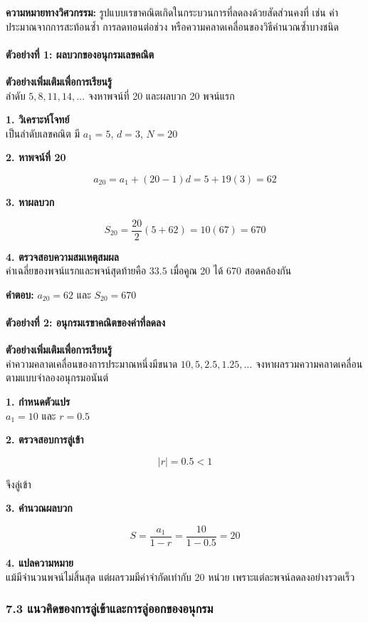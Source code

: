 \textbf{ความหมายทางวิศวกรรม:} รูปแบบเรขาคณิตเกิดในกระบวนการที่ลดลงด้วยสัดส่วนคงที่ เช่น ค่าประมาณจากการสะท้อนซ้ำ การลดทอนต่อช่วง หรือความคลาดเคลื่อนของวิธีคำนวณซ้ำบางชนิด

\paragraph{ตัวอย่างที่ 1: ผลบวกของอนุกรมเลขคณิต}

\textbf{ตัวอย่างเพิ่มเติมเพื่อการเรียนรู้}\\
ลำดับ \(5,8,11,14,\ldots\) จงหาพจน์ที่ 20 และผลบวก 20 พจน์แรก

\textbf{1. วิเคราะห์โจทย์}\\
เป็นลำดับเลขคณิต มี \(a_1=5\), \(d=3\), \(N=20\)

\textbf{2. หาพจน์ที่ 20}

\[
a_{20}=a_1+(20-1)d=5+19(3)=62
\]

\textbf{3. หาผลบวก}

\[
S_{20}=\frac{20}{2}(5+62)=10(67)=670
\]

\textbf{4. ตรวจสอบความสมเหตุสมผล}\\
ค่าเฉลี่ยของพจน์แรกและพจน์สุดท้ายคือ \(33.5\) เมื่อคูณ 20 ได้ \(670\) สอดคล้องกัน

\textbf{คำตอบ:} \(a_{20}=62\) และ \(S_{20}=670\)

\paragraph{ตัวอย่างที่ 2: อนุกรมเรขาคณิตของค่าที่ลดลง}

\textbf{ตัวอย่างเพิ่มเติมเพื่อการเรียนรู้}\\
ค่าความคลาดเคลื่อนของการประมาณหนึ่งมีขนาด \(10,5,2.5,1.25,\ldots\) จงหาผลรวมความคลาดเคลื่อนตามแบบจำลองอนุกรมอนันต์

\textbf{1. กำหนดตัวแปร}\\
\(a_1=10\) และ \(r=0.5\)

\textbf{2. ตรวจสอบการลู่เข้า}

\[
|r|=0.5<1
\]

จึงลู่เข้า

\textbf{3. คำนวณผลบวก}

\[
S=\frac{a_1}{1-r}=\frac{10}{1-0.5}=20
\]

\textbf{4. แปลความหมาย}\\
แม้มีจำนวนพจน์ไม่สิ้นสุด แต่ผลรวมมีค่าจำกัดเท่ากับ 20 หน่วย เพราะแต่ละพจน์ลดลงอย่างรวดเร็ว

\subsubsection{7.3 แนวคิดของการลู่เข้าและการลู่ออกของอนุกรม}

